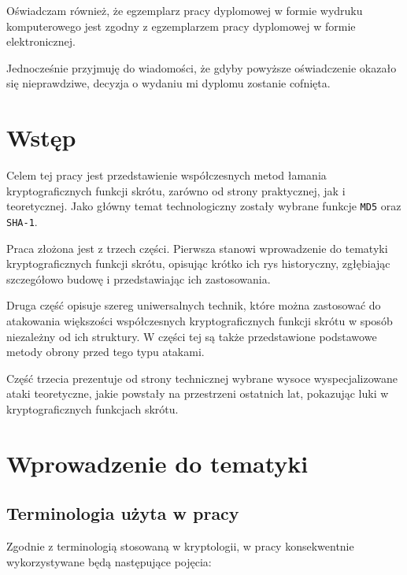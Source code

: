 \documentclass[12pt,a4paper,twoside]{article}
\begin{document}
Oświadczam również, że egzemplarz pracy dyplomowej w formie wydruku
komputerowego jest zgodny z egzemplarzem pracy dyplomowej w formie
elektronicznej.

Jednocześnie przyjmuję do wiadomości, że gdyby powyższe oświadczenie okazało
się nieprawdziwe, decyzja o wydaniu mi dyplomu zostanie cofnięta.


\newpage
\setcounter{tocdepth}{3}
\tableofcontents

\newpage
\pagestyle{fancy}


\section{Wstęp}
Celem tej pracy jest przedstawienie współczesnych metod łamania
kryptograficznych funkcji skrótu, zarówno od strony praktycznej, jak i
teoretycznej. Jako główny temat technologiczny zostały wybrane funkcje
\texttt{MD5} oraz \texttt{SHA-1}.

Praca złożona jest z trzech części. Pierwsza stanowi wprowadzenie do tematyki
kryptograficznych funkcji skrótu, opisując krótko ich rys historyczny,
zgłębiając szczegółowo budowę i przedstawiając ich zastosowania.

Druga część opisuje szereg uniwersalnych technik, które można zastosować do
atakowania większości współczesnych kryptograficznych funkcji skrótu w sposób
niezależny od ich struktury. W części tej są także przedstawione podstawowe
metody obrony przed tego typu atakami.

Część trzecia prezentuje od strony technicznej wybrane wysoce wyspecjalizowane
ataki teoretyczne, jakie powstały na przestrzeni ostatnich lat, pokazując luki
w kryptograficznych funkcjach skrótu.

\newpage



\section{Wprowadzenie do tematyki}

\subsection{Terminologia użyta w pracy}

Zgodnie z terminologią stosowaną w kryptologii, w pracy konsekwentnie
wykorzystywane będą następujące pojęcia:
\end{document}
